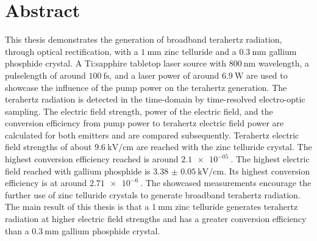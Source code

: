 \thispagestyle{plain}

\section*{Abstract}

This thesis demonstrates the generation of broadband terahertz radiation, through optical rectification, with a $\SI{1}{\milli\meter}$ zinc telluride and a $\SI{0.3}{\milli\meter}$ gallium phosphide crystal.
A Ti:sapphire tabletop laser source with $\SI{800}{\nano\meter}$ wavelength, a pulselength of around $\SI{100}{\femto\second}$, and a laser power of around $\SI{6.9}{\W}$ are used to showcase the influence of the pump power on the terahertz generation.
The terahertz radiation is detected in the time-domain by time-resolved electro-optic sampling.
The electric field strength, power of the electric field, and the conversion efficiency from pump power to terahertz electric field power are calculated for both emitters and are compared subsequently.
Terahertz electric field strengths of about $\SI{9.6}{\kilo\V\per\centi\meter}$ are reached with the zinc telluride crystal.
The highest conversion efficiency reached is around $\SI{2.1e-05}{}$.
The highest electric field reached with gallium phosphide is $\SI{3.38(5)}{\kilo\V\per\centi\meter}$.
Its highest conversion efficiency is at around $\SI{2.71e-6}{}$.
The showcased measurements encourage the further use of zinc telluride crystals to generate broadband terahertz radiation.
The main result of this thesis is that a $\SI{1}{\milli\meter}$ zinc telluride generates terahertz radiation at higher electric field strengths and has a greater conversion efficiency than a $\SI{0.3}{\milli\meter}$ gallium phosphide crystal. 

